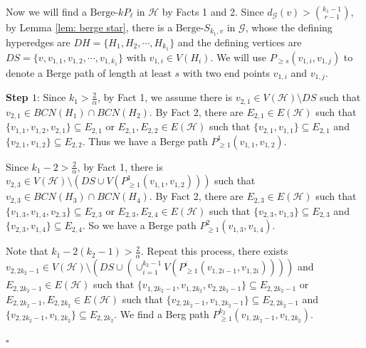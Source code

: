 \documentclass[12pt]{article}%
\newenvironment{proof}{{\noindent\it Proof.}}{\hfill $\square$\par}
\newcommand{\ber}{\text{Berge-}}
\newcommand{\mh}{\mathcal{H}}
\newcommand{\mg}{\mathcal{G}}
\begin{document}
\begin{proof}
   Now we will find a $\ber kP_{\ell}$ in $\mh$ by Facts 1 and 2. Since $d_\mg(v)>\binom{k_1-1}{r-1}$, by Lemma \ref{lem: berge star}, there is a $\ber S_{k_1,v}$ in $\mg$, whose the defining hyperedges are $DH=\{H_1,H_2,\cdots,H_{k_1}\}$ and the defining vertices are $DS=\{v,v_{1,1},v_{1,2},\cdots,v_{1,k_1}\}$ with $v_{1,i}\in V(H_i)$. We will use $P_{\ge s}(v_{1,i},v_{1,j})$ to denote a Berge path of length at least $s$ with two end points $v_{1,i}$ and $v_{1,j}$.


   \par \noindent
   \textbf{Step $1$}:
      Since $k_1>\frac{2}{\alpha}$, by Fact 1, we assume there is $v_{2,1}\in V(\mh)\setminus DS $ such that $v_{2,1}\in BCN(H_1)\cap BCN(H_2)$. By Fact 2, there are $E_{2,1}\in E(\mh)$ such that $\{v_{1,1},v_{1,2},v_{2,1}\}\subseteq E_{2,1}$ or  $E_{2,1},E_{2,2}\in E(\mh)$ such that $\{v_{2,1},v_{1,1}\}\subseteq E_{2,1}$ and $\{v_{2,1},v_{1,2}\}\subseteq E_{2,2}$. Thus we have a Berge path $P_{\ge1}^{1}(v_{1,1},v_{1,2})$.
      \par
      Since $k_1-2>\frac{2}{\alpha}$, by Fact 1, there is $v_{2,3}\in V(\mh)\setminus (DS\cup V(P_{\ge1}^{1}(v_{1,1},v_{1,2})))$ such that $v_{2,3}\in BCN(H_3)\cap BCN(H_4)$. By Fact 2, there are $E_{2,3}\in E(\mh)$ such that $\{v_{1,3},v_{1,4},v_{2,3}\}\subseteq E_{2,3}$ or  $E_{2,3},E_{2,4}\in E(\mh)$ such that $\{v_{2,3},v_{1,3}\}\subseteq E_{2,3}$ and $\{v_{2,3},v_{1,4}\}\subseteq E_{2,4}$. So we have a Berge path $P_{\ge1}^{2}(v_{1,3},v_{1,4})$.
      \par
     Note that
      $k_1-2(k_2-1)>\frac{2}{\alpha}$.   Repeat this process,  there exists $v_{2,2k_2-1}\in V(\mh)\setminus (DS\cup \left(\cup_{i=1}^{k_2-1}V(P_{\ge 1}^{i}(v_{1,2i-1},v_{1,2i}))\right))$ and  $E_{2,2k_2-1}\in E(\mh)$ such that $\{v_{1,2k_2-1},v_{1,2k_2},v_{2,2k_2-1}\}\subseteq E_{2,2k_2-1}$ or  $E_{2,2k_2-1},E_{2,2k_2}\in E(\mh)$ such that $\{v_{2,2k_2-1},v_{1,2k_2-1}\}\subseteq E_{2,2k_2-1}$ and $\{v_{2,2k_2-1},v_{1,2k_2}\}\subseteq E_{2,2k_2}$. We find a Berg path $P_{\ge1}^{k_2}(v_{1,2k_2-1},v_{1,2k_2})$.
    \par


\end{proof}
\end{document}
